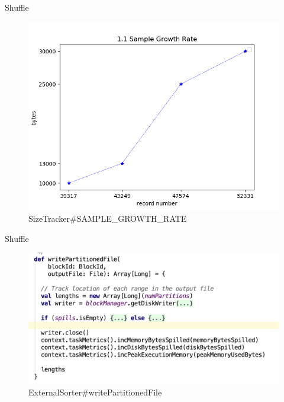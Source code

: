 \begin{frame}[plain,t]{Shuffle} %
	 \\  \vspace{2ex}
	\begin{figure}
		\centering
		\includegraphics[width=0.7\linewidth]{images/s002}
		\caption{SizeTracker\#SAMPLE\_GROWTH\_RATE}
		\label{fig:s002}
	\end{figure}
	
\end{frame}
\begin{frame}[plain,t]{Shuffle} %
	 \\  \vspace{2ex}
	\begin{figure}
		\centering
		\includegraphics[width=0.9\linewidth]{images/shufflewriter003}
		\caption{ExternalSorter\#writePartitionedFile}
		\label{fig:shufflewriter003}
	\end{figure}
	
	
\end{frame}
